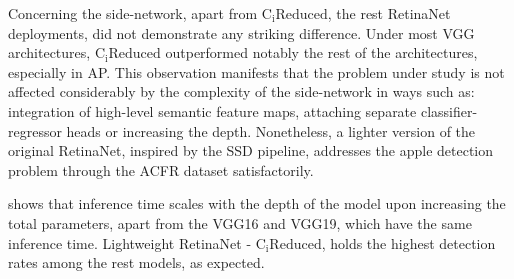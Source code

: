 Concerning the side-network, apart from $\text{C}_\text{i}\text{Reduced}$, the rest RetinaNet deployments, did not demonstrate any striking difference. Under most VGG architectures, $\text{C}_\text{i}\text{Reduced}$ outperformed notably the rest of the architectures, especially in AP. This observation manifests that the problem under study is not affected considerably by the complexity of the side-network in ways such as: integration of high-level semantic feature maps, attaching separate classifier-regressor heads or increasing the depth. Nonetheless, a lighter version of the original RetinaNet, inspired by the SSD pipeline, addresses the apple detection problem through the ACFR dataset satisfactorily.

 shows that inference time scales with the depth of the model upon increasing the total parameters, apart from the VGG16 and VGG19, which have the same inference time. Lightweight RetinaNet - $\text{C}_\text{i}\text{Reduced}$, holds the highest detection rates among the rest models, as expected.


\begin{table}[!htb]
  \centering
  \caption{Inference time for every VGG. Detection rates depend heavily on the No. of parameters of the model and the input resolution. However, the transition from VGG16 to VGG19 did not show any change.}
  \label{tab3}
\end{table}

